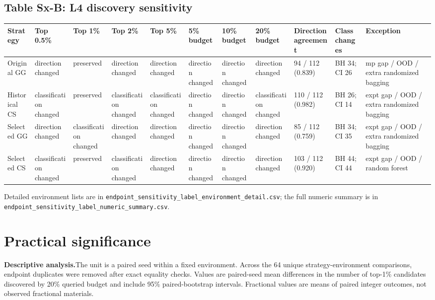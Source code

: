 \documentclass[9pt]{article}
\newcommand{\evidencelabel}[1]{\textbf{#1}\enspace}
\begin{document}
\begin{landscape}
\section{Table Sx-B: L4 discovery sensitivity}
{\fontsize{8}{9.6}\selectfont
\begin{tabularx}{\linewidth}{lYYYYYYYYYY}
\toprule
Strategy & Top 0.5\% & Top 1\% & Top 2\% & Top 5\% & 5\% budget & 10\% budget & 20\% budget & Direction agreement & Class changes & Exception\\
\midrule
Original GG & direction changed & preserved & direction changed & direction changed & direction changed & direction changed & direction changed & 94 / 112 (0.839) & BH 34; CI 26 & mp gap / OOD / extra randomized bagging\\
Historical CS & classification changed & preserved & classification changed & classification changed & direction changed & direction changed & classification changed & 110 / 112 (0.982) & BH 26; CI 14 & expt gap / OOD / extra randomized bagging\\
Selected GG & direction changed & classification changed & direction changed & direction changed & direction changed & direction changed & direction changed & 85 / 112 (0.759) & BH 34; CI 35 & expt gap / OOD / extra randomized bagging\\
Selected CS & classification changed & preserved & classification changed & direction changed & direction changed & direction changed & direction changed & 103 / 112 (0.920) & BH 44; CI 44 & expt gap / OOD / random forest\\
\bottomrule
\end{tabularx}}
\end{landscape}

Detailed environment lists are in
\texttt{endpoint\_sensitivity\_label\_environment\_detail.csv}; the full
numeric summary is in
\texttt{endpoint\_sensitivity\_label\_numeric\_summary.csv}.

\section{Practical significance}
\evidencelabel{Descriptive analysis.}The unit is a paired seed within a fixed
environment. Across the 64 unique strategy-environment comparisons, endpoint
duplicates were removed after exact equality checks. Values are paired-seed
mean differences in the number of top-1\% candidates discovered by 20\%
queried budget and include 95\% paired-bootstrap intervals. Fractional values
are means of paired integer outcomes, not observed fractional materials.
\end{document}
